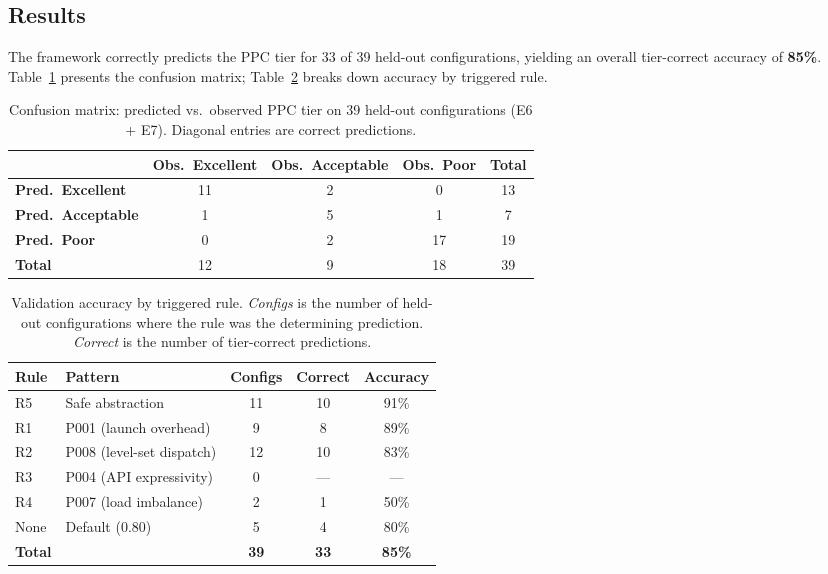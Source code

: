 \subsection{Results}
\label{subsec:val_results}

The framework correctly predicts the PPC tier for 33 of 39 held-out
configurations, yielding an overall tier-correct accuracy of
\textbf{85\%}. Table~\ref{tab:confusion} presents the confusion matrix;
Table~\ref{tab:val_rules} breaks down accuracy by triggered rule.

\begin{table}[t]
\centering
\caption{Confusion matrix: predicted vs.\ observed PPC tier on 39 held-out
configurations (E6 + E7). Diagonal entries are correct predictions.}
\label{tab:confusion}
\begin{tabular}{lccc|c}
\hline
 & \textbf{Obs.\ Excellent} & \textbf{Obs.\ Acceptable}
 & \textbf{Obs.\ Poor} & \textbf{Total} \\
\hline
\textbf{Pred.\ Excellent}   & 11 & 2 & 0 & 13 \\
\textbf{Pred.\ Acceptable}  &  1 & 5 & 1 &  7 \\
\textbf{Pred.\ Poor}        &  0 & 2 & 17 & 19 \\
\hline
\textbf{Total}               & 12 & 9 & 18 & 39 \\
\hline
\end{tabular}
\end{table}

\begin{table}[t]
\centering
\caption{Validation accuracy by triggered rule. \textit{Configs} is the
number of held-out configurations where the rule was the determining
prediction. \textit{Correct} is the number of tier-correct predictions.}
\label{tab:val_rules}
\begin{tabular}{llccc}
\hline
\textbf{Rule} & \textbf{Pattern} & \textbf{Configs} & \textbf{Correct}
& \textbf{Accuracy} \\
\hline
R5 & Safe abstraction & 11 & 10 & 91\% \\
R1 & P001 (launch overhead) & 9 & 8 & 89\% \\
R2 & P008 (level-set dispatch) & 12 & 10 & 83\% \\
R3 & P004 (API expressivity) & 0 & --- & --- \\
R4 & P007 (load imbalance) & 2 & 1 & 50\% \\
None & Default ($0.80$) & 5 & 4 & 80\% \\
\hline
\textbf{Total} & & \textbf{39} & \textbf{33} & \textbf{85\%} \\
\hline
\end{tabular}
\end{table}

